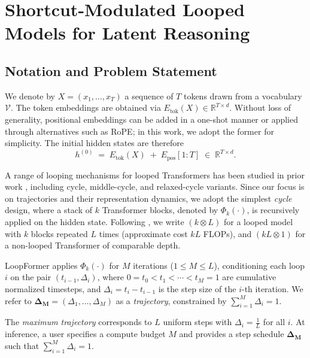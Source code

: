 \section{Shortcut-Modulated Looped Models for Latent Reasoning}
\label{sec:method}


\subsection{Notation and Problem Statement}

We denote by $X = (x_1, \dots, x_T)$ a sequence of $T$ tokens drawn from a vocabulary $\mathcal{V}$. The token embeddings are obtained via $E_{\text{tok}}(X) \in \mathbb{R}^{T \times d}$. Without loss of generality, positional embeddings can be added in a one-shot manner or applied through alternatives such as RoPE; in this work, we adopt the former for simplicity. The initial hidden states are therefore
\[
h^{(0)} \;=\; E_{\text{tok}}(X)\;+\;E_{\text{pos}}[1{:}T] \;\in\; \mathbb{R}^{T\times d}.
\]

A range of looping mechanisms for looped Transformers has been studied in prior work \cite{takase2021lessons, saunshi2025reasoning, bae2025mixture, bae2024relaxed}, including cycle, middle-cycle, and relaxed-cycle variants. Since our focus is on trajectories and their representation dynamics, we adopt the simplest \emph{cycle} design, where a stack of $k$ Transformer blocks, denoted by $\Phi_k(\cdot)$, is recursively applied on the hidden state. Following \cite{saunshi2025reasoning}, we write $(k \otimes L)$ for a looped model with $k$ blocks repeated $L$ times (approximate cost $kL$ FLOPs), and $(kL \otimes 1)$ for a non-looped Transformer of comparable depth.

LoopFormer applies $\Phi_k(\cdot)$ for $M$ iterations ($1 \le M \le L$), conditioning each loop $i$ on the pair $(t_{i-1}, \Delta_i)$, where $0 = t_0 < t_1 < \cdots < t_M = 1$ are cumulative normalized timesteps, and $\Delta_i = t_i - t_{i-1}$ is the step size of the $i$-th iteration. We refer to $\boldsymbol{\Delta_M} = (\Delta_1, \dots, \Delta_M)$ as a \emph{trajectory}, constrained by $\sum_{i=1}^M \Delta_i = 1$.

The \emph{maximum trajectory} corresponds to $L$ uniform steps with $\Delta_i = \frac{1}{L}$ for all $i$. At inference, a user specifies a compute budget $M$ and provides a step schedule $\boldsymbol{\Delta_M}$ such that $\sum_{i=1}^M \Delta_i = 1$.




